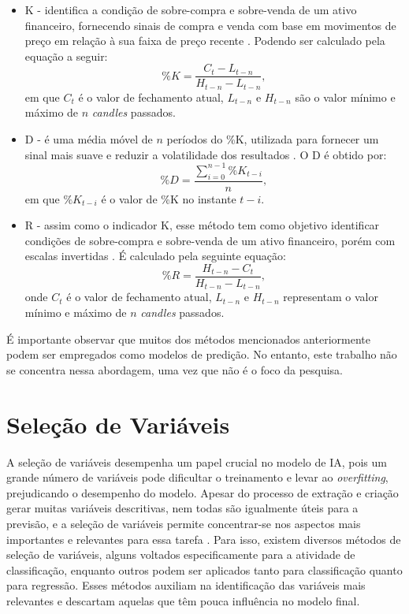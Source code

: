 \begin{itemize}
    \item \ac{K} - identifica a condição de sobre-compra e sobre-venda de um ativo financeiro, fornecendo sinais de compra e venda com base em movimentos de preço em relação à sua faixa de preço recente \cite{Leonardo_Comparative, C_Veeramani_Exploration}. Podendo ser calculado pela equação a seguir: 
    \begin{equation}
        \label{eq:K}
        \%K = \frac{C_t-L_{t-n}}{H_{t-n}-L_{t-n}},
    \end{equation}
    em que $C_t$ é o valor de fechamento atual, $L_{t-n}$ e $H_{t-n}$ são o valor mínimo e máximo de $n$ \textit{candles} passados.
    
    \item \ac{D} - é uma média móvel de $n$ períodos do \%K, utilizada para fornecer um sinal mais suave e reduzir a volatilidade dos resultados \cite{Leonardo_Comparative, C_Veeramani_Exploration}. O \ac{D} é obtido por:
    \begin{equation}
        \label{eq:D}
        \%D = \frac{\sum_{i=0}^{n-1}\%K_{t-i}}{n},
    \end{equation}
    em que $\%K_{t-i}$ é o valor de \%K no instante $t-i$.

    \item \ac{R} - assim como o indicador \ac{K}, esse método tem como objetivo identificar condições de sobre-compra e sobre-venda de um ativo financeiro, porém com escalas invertidas \cite{lee2021exploring}. É calculado pela seguinte equação: 
    \begin{equation}
        \label{eq:R} 
        \%R = \frac{H_{t-n}-C_t}{H_{t-n}-L_{t-n}},
    \end{equation}
    onde $C_t$ é o valor de fechamento atual, $L_{t-n}$ e $H_{t-n}$ representam o valor mínimo e máximo de $n$ \textit{candles} passados. 
\end{itemize}


É importante observar que muitos dos métodos mencionados anteriormente podem ser empregados como modelos de predição. No entanto, este trabalho não se concentra nessa abordagem, uma vez que não é o foco da pesquisa.

\section{Seleção de Variáveis}
\label{subsec:selecao_variaveis}
A seleção de variáveis desempenha um papel crucial no modelo de IA, pois um grande número de variáveis pode dificultar o treinamento e levar ao \textit{overfitting}, prejudicando o desempenho do modelo. Apesar do processo de extração e criação gerar muitas variáveis descritivas, nem todas são igualmente úteis para a previsão, e a seleção de variáveis permite concentrar-se nos aspectos mais importantes e relevantes para essa tarefa \cite{meyer2019importance}.
Para isso, existem diversos métodos de seleção de variáveis, alguns voltados especificamente para a atividade de classificação, enquanto outros podem ser aplicados tanto para classificação quanto para regressão. Esses métodos auxiliam na identificação das variáveis mais relevantes e descartam aquelas que têm pouca influência no modelo final. 

